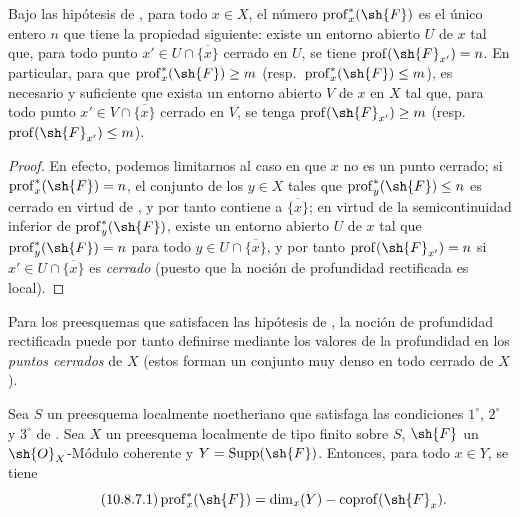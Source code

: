 \begin{corollary}[10.8.6]
\label{IV.10.8.6}
Bajo las hipótesis de , para todo $x\in X$, el número $\operatorname{prof}^*_x(\sh{F})$ es el único entero $n$ que tiene la propiedad siguiente: existe un entorno abierto $U$ de $x$ tal que, para todo punto $x'\in U\cap\overline{\{x\}}$ cerrado \textup{en} $U$, se tiene $\operatorname{prof}(\sh{F}_{x'})=n$.
En particular, para que $\operatorname{prof}^*_x(\sh{F})\geq m$ \textup{(resp.\ $\operatorname{prof}^*_x(\sh{F})\leq m$)}, es necesario y suficiente que exista un entorno abierto $V$ de $x$ en $X$ tal que, para todo punto $x'\in V\cap\overline{\{x\}}$ cerrado \textup{en} $V$, se tenga $\operatorname{prof}(\sh{F}_{x'})\geq m$ \textup{(resp.\ $\operatorname{prof}(\sh{F}_{x'})\leq m$)}.
\end{corollary}

\begin{proof}
En efecto, podemos limitarnos al caso en que $x$ no es un punto cerrado; si $\operatorname{prof}^*_x(\sh{F})=n$, el conjunto de los $y\in X$ tales que $\operatorname{prof}^*_y(\sh{F})\leq n$ es cerrado en virtud de , y por tanto contiene a $\overline{\{x\}}$; en virtud de la semicontinuidad inferior de $\operatorname{prof}^*_y(\sh{F})$, existe un entorno abierto $U$ de $x$ tal que $\operatorname{prof}^*_y(\sh{F})=n$ para todo $y\in U\cap\overline{\{x\}}$, y por tanto $\operatorname{prof}(\sh{F}_{x'})=n$ si $x'\in U\cap\overline{\{x\}}$ es \emph{cerrado} (puesto que la noción de profundidad rectificada es local).
\end{proof}

Para los preesquemas que satisfacen las hipótesis de , la noción de profundidad rectificada puede por tanto definirse mediante los valores de la profundidad en los \emph{puntos cerrados} de $X$ (estos forman un conjunto muy denso en todo cerrado de $X$).

\begin{proposition}[10.8.7]
\label{IV.10.8.7}
Sea $S$ un preesquema localmente noetheriano que satisfaga las condiciones $1^\circ$, $2^\circ$ y $3^\circ$ de .
Sea $X$ un preesquema localmente de tipo finito sobre $S$, $\sh{F}$ un $\sh{O}_X$-Módulo coherente y $Y=\operatorname{Supp}(\sh{F})$.
Entonces, para todo $x\in Y$, se tiene
\begin{equation}
\label{IV.10.8.7.1}
\tag{10.8.7.1}
\operatorname{prof}^*_x(\sh{F})=\dim_x(Y)-\operatorname{coprof}(\sh{F}_x).
\end{equation}
\end{proposition}

